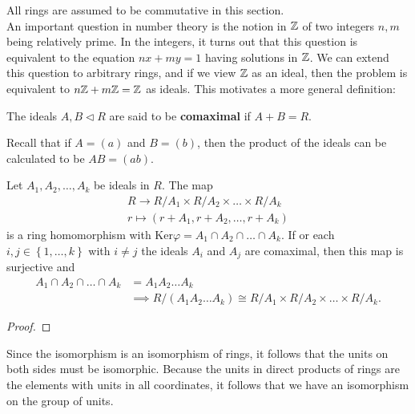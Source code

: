 \documentclass{memoir}
\begin{document}


All rings are assumed to be commutative in this section.\\

An important question in number theory is the notion in \(\mathbb{Z}\) of two integers \(n,m\) being relatively prime. In the integers, it turns out that this question is equivalent to the equation \(nx+my=1\) having solutions in \(\mathbb{Z}\). We can extend this question to arbitrary rings, and if we view \(\mathbb{Z}\) as an ideal, then the problem is equivalent to \(n\mathbb{Z}+m\mathbb{Z}=\mathbb{Z}\) as ideals. This motivates a more general definition:
\begin{defn}[Comaximal]
	The ideals \(A,B\triangleleft R\) are said to be \textbf{comaximal} if \(A+B = R\).
\end{defn}

Recall that if \(A = (a)\) and \(B = (b)\), then the product of the ideals can be calculated to be \(AB = (ab)\).

\begin{thm}
	Let \(A_1,A_2,\ldots,A_k\) be ideals in \(R\). The map
	\begin{align*}
		R \to R / A_1 \times R / A_2 \times  \ldots \times R / A_k\\
		r\mapsto (r+A_1,r+A_2,\ldots,r+A_k)
	\end{align*}
	is a ring homomorphism with \(\textrm{Ker}\varphi = A_1 \cap A_2 \cap \ldots \cap A_k\). If or each \(i,j \in \left\{ 1,\ldots,k \right\} \) with \(i\neq j\) the ideals \(A_i\) and \(A_j\) are comaximal, then this map is surjective and
	\begin{align*}
		A_1\cap A_2\cap \ldots\cap A_k &= A_1A_2\ldots A_k\\
			&\implies R / (A_1A_2\ldots A_k) \cong R / A_1 \times R / A_2 \times \ldots\times R / A_k.
	\end{align*}
\end{thm}
\begin{proof}
	
\end{proof}

Since the isomorphism is an isomorphism of rings, it follows that the units on both sides must be isomorphic. Because the units in direct products of rings are the elements with units in all coordinates, it follows that we have an isomorphism on the group of units.
\end{document}
